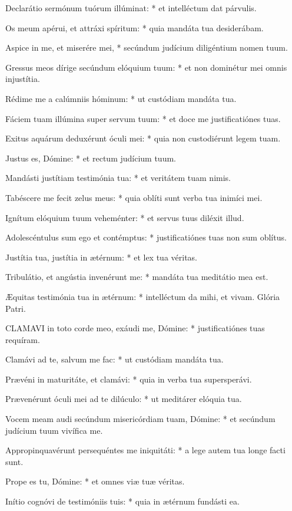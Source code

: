 Declarátio sermónum tuórum illúminat: * et intelléctum dat párvulis.

Os meum apérui, et attráxi spíritum: * quia mandáta tua desiderábam.

Aspice in me, et miserére mei, * secúndum judícium diligéntium nomen tuum.

Gressus meos dírige secúndum elóquium tuum: * et non dominétur mei omnis injustítia.

Rédime me a calúmniis hóminum: * ut custódiam mandáta tua.

Fáciem tuam illúmina super servum tuum: * et doce me justificatiónes tuas.

Exitus aquárum deduxérunt óculi mei: * quia non custodiérunt legem tuam.

Justus es, Dómine: * et rectum judícium tuum.

Mandásti justítiam testimónia tua: * et veritátem tuam nimis.

Tabéscere me fecit zelus meus: * quia oblíti sunt verba tua inimíci mei.

Ignítum elóquium tuum veheménter: * et servus tuus diléxit illud.

Adolescéntulus sum ego et contémptus: * justificatiónes tuas non sum oblítus.

Justítia tua, justítia in ætérnum: * et lex tua véritas.

Tribulátio, et angústia invenérunt me: * mandáta tua meditátio mea est.

Æquitas testimónia tua in ætérnum: * intelléctum da mihi, et vivam. Glória Patri.


\lettrine[lines=2]{C}{LAMAVI} in toto corde meo, exáudi me, Dómine: * justificatiónes tuas requíram.

Clamávi ad te, salvum me fac: * ut custódiam mandáta tua.

Prævéni in maturitáte, et clamávi: * quia in verba tua supersperávi.

Prævenérunt óculi mei ad te dilúculo: * ut meditárer elóquia tua.

Vocem meam audi secúndum misericórdiam tuam, Dómine: * et secúndum judícium tuum vivífica me.

Appropinquavérunt persequéntes me iniquitáti: * a lege autem tua longe facti sunt.

Prope es tu, Dómine: * et omnes viæ tuæ véritas.

Inítio cognóvi de testimóniis tuis: * quia in ætérnum fundásti ea.

